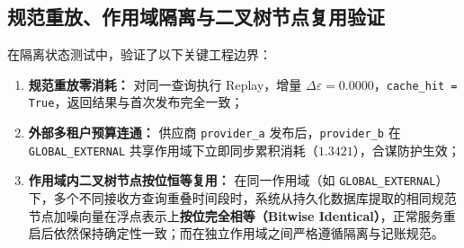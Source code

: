 \subsection{规范重放、作用域隔离与二叉树节点复用验证}
在隔离状态测试中，验证了以下关键工程边界：
\begin{enumerate}[label=(\alph*), leftmargin=2.5em]
  \item \textbf{规范重放零消耗：} 对同一查询执行 Replay，增量 $\Delta\varepsilon = 0.0000$，\texttt{cache\_hit = True}，返回结果与首次发布完全一致；
  \item \textbf{外部多租户预算连通：} 供应商 \texttt{provider\_a} 发布后，\texttt{provider\_b} 在 \texttt{GLOBAL\_}\allowbreak\texttt{EXTERNAL} 共享作用域下立即同步累积消耗（$1.3421$），合谋防护生效；
  \item \textbf{作用域内二叉树节点按位恒等复用：} 在同一作用域（如 \texttt{GLOBAL\_EXTERNAL}）下，多个不同接收方查询重叠时间段时，系统从持久化数据库提取的相同规范节点加噪向量在浮点表示上\textbf{按位完全相等（Bitwise Identical）}，正常服务重启后依然保持确定性一致；而在独立作用域之间严格遵循隔离与记账规范。
\end{enumerate}
